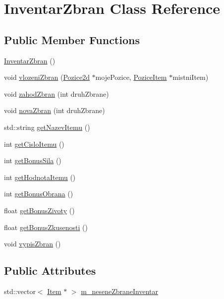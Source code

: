 \hypertarget{class_inventar_zbran}{\section{Inventar\-Zbran Class Reference}
\label{class_inventar_zbran}
}
\subsection*{Public Member Functions}
\begin{DoxyCompactItemize}
\item 
\hyperlink{class_inventar_zbran_a8f044e253991c09df7ad754d7443411d}{Inventar\-Zbran} ()
\item 
void \hyperlink{class_inventar_zbran_add49cb1b8e8b7039bbce2cec95ab7231}{vlozeni\-Zbran} (\hyperlink{struct_pozice2d}{Pozice2d} $\ast$moje\-Pozice, \hyperlink{class_pozice_item}{Pozice\-Item} $\ast$mistni\-Item)
\item 
void \hyperlink{class_inventar_zbran_a38dce51d0dd332f5734af26860041f17}{zahod\-Zbran} (int druh\-Zbrane)
\item 
void \hyperlink{class_inventar_zbran_a1cf8eea2896a336c6f16befd77a105ea}{nova\-Zbran} (int druh\-Zbrane)
\item 
std\-::string \hyperlink{class_inventar_zbran_ab380d53dfadaeedac7c775cbd6e6ae15}{get\-Nazev\-Itemu} ()
\item 
int \hyperlink{class_inventar_zbran_ae9411d84f602cb5f6bcd8cee3d9f3083}{get\-Cislo\-Itemu} ()
\item 
int \hyperlink{class_inventar_zbran_a326fb573625f6296503cce9b8037935d}{get\-Bonus\-Sila} ()
\item 
int \hyperlink{class_inventar_zbran_a80beef21c29ac53f0f3057572b454999}{get\-Hodnota\-Itemu} ()
\item 
int \hyperlink{class_inventar_zbran_a50af8b1b588a7d628e6c94d08f53ad80}{get\-Bonus\-Obrana} ()
\item 
float \hyperlink{class_inventar_zbran_a3914216b3a654e6c25b27b4d0a5a3eb2}{get\-Bonus\-Zivoty} ()
\item 
float \hyperlink{class_inventar_zbran_a2fcbac8c9c47e1f6933e718a6bff2a40}{get\-Bonus\-Zkusenosti} ()
\item 
void \hyperlink{class_inventar_zbran_a2980b1c182c6454a6a67cb445024929b}{vypis\-Zbran} ()
\end{DoxyCompactItemize}
\subsection*{Public Attributes}
\begin{DoxyCompactItemize}
\item 
std\-::vector$<$ \hyperlink{class_item}{Item} $\ast$ $>$ \hyperlink{class_inventar_zbran_a324d36769f1d1d55da5453aaf3089f56}{m\-\_\-nesene\-Zbrane\-Inventar}
\end{DoxyCompactItemize}


